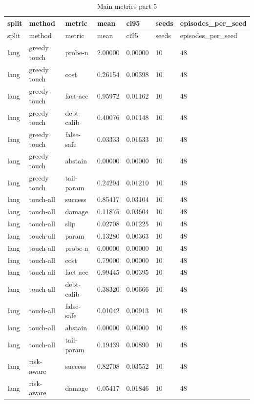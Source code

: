 \documentclass{article}
\begin{document}
\begin{center}
\tiny
\renewcommand{\arraystretch}{0.92}
\setlength{\tabcolsep}{3pt}
\begin{longtable}{lllllll}
\caption{Main metrics part 5}\label{tab:main-metrics-5}\\
\toprule
split & method & metric & mean & ci95 & seeds & episodes\_per\_seed \\
\midrule
\endfirsthead
\toprule
split & method & metric & mean & ci95 & seeds & episodes\_per\_seed \\
\midrule
\endhead
lang & greedy touch & probe-n & 2.00000 & 0.00000 & 10 & 48 \\
lang & greedy touch & cost & 0.26154 & 0.00398 & 10 & 48 \\
lang & greedy touch & fact-acc & 0.95972 & 0.01162 & 10 & 48 \\
lang & greedy touch & debt-calib & 0.40076 & 0.01148 & 10 & 48 \\
lang & greedy touch & false-safe & 0.03333 & 0.01633 & 10 & 48 \\
lang & greedy touch & abstain & 0.00000 & 0.00000 & 10 & 48 \\
lang & greedy touch & tail-param & 0.24294 & 0.01210 & 10 & 48 \\
lang & touch-all & success & 0.85417 & 0.03104 & 10 & 48 \\
lang & touch-all & damage & 0.11875 & 0.03604 & 10 & 48 \\
lang & touch-all & slip & 0.02708 & 0.01225 & 10 & 48 \\
lang & touch-all & param & 0.13280 & 0.00363 & 10 & 48 \\
lang & touch-all & probe-n & 6.00000 & 0.00000 & 10 & 48 \\
lang & touch-all & cost & 0.79000 & 0.00000 & 10 & 48 \\
lang & touch-all & fact-acc & 0.99445 & 0.00395 & 10 & 48 \\
lang & touch-all & debt-calib & 0.38320 & 0.00666 & 10 & 48 \\
lang & touch-all & false-safe & 0.01042 & 0.00913 & 10 & 48 \\
lang & touch-all & abstain & 0.00000 & 0.00000 & 10 & 48 \\
lang & touch-all & tail-param & 0.19439 & 0.00890 & 10 & 48 \\
lang & risk-aware & success & 0.82708 & 0.03552 & 10 & 48 \\
lang & risk-aware & damage & 0.05417 & 0.01846 & 10 & 48 \\

\end{longtable}
\end{center}
\end{document}
